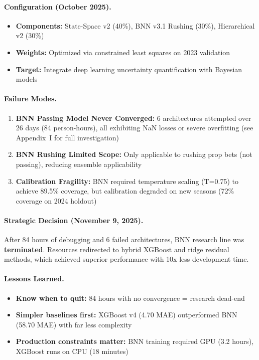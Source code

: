 \paragraph{Configuration (October 2025).}
\begin{itemize}[itemsep=2pt,parsep=0pt]
    \item \textbf{Components:} State-Space v2 (40\%), BNN v3.1 Rushing (30\%), Hierarchical v2 (30\%)
    \item \textbf{Weights:} Optimized via constrained least squares on 2023 validation
    \item \textbf{Target:} Integrate deep learning uncertainty quantification with Bayesian models
\end{itemize}

\paragraph{Failure Modes.}
\begin{enumerate}[itemsep=2pt,parsep=0pt]
    \item \textbf{BNN Passing Model Never Converged:} 6 architectures attempted over 26 days (84 person-hours), all exhibiting NaN losses or severe overfitting (see Appendix~I for full investigation)
    \item \textbf{BNN Rushing Limited Scope:} Only applicable to rushing prop bets (not passing), reducing ensemble applicability
    \item \textbf{Calibration Fragility:} BNN required temperature scaling (T=0.75) to achieve 89.5\% coverage, but calibration degraded on new seasons (72\% coverage on 2024 holdout)
\end{enumerate}

\paragraph{Strategic Decision (November 9, 2025).}
After 84 hours of debugging and 6 failed architectures, BNN research line was \textbf{terminated}. Resources redirected to hybrid XGBoost and ridge residual methods, which achieved superior performance with 10x less development time.

\paragraph{Lessons Learned.}
\begin{itemize}[itemsep=2pt,parsep=0pt]
    \item \textbf{Know when to quit:} 84 hours with no convergence = research dead-end
    \item \textbf{Simpler baselines first:} XGBoost v4 (4.70 MAE) outperformed BNN (58.70 MAE) with far less complexity
    \item \textbf{Production constraints matter:} BNN training required GPU (3.2 hours), XGBoost runs on CPU (18 minutes)
\end{itemize}

